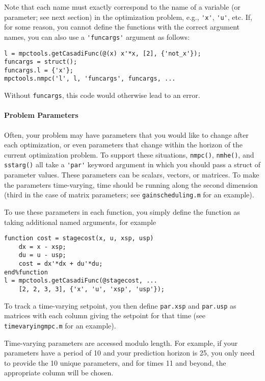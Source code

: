 \documentclass{article}
\begin{document}
\begin{multicols}{2}
Note that each name must exactly correspond to the name of a variable (or parameter; see next section) in the optimization problem, e.g., \lstinline|'x'|, \lstinline|'u'|, etc.
If, for some reason, you cannot define the functions with the correct argument names, you can also use a \lstinline|'funcargs'| argument as follows:
%
\begin{lstlisting}[frame=L]
l = mpctools.getCasadiFunc(@(x) x'*x, [2], {'not_x'});
funcargs = struct();
funcargs.l = {'x'};
mpctools.nmpc('l', l, 'funcargs', funcargs, ...
\end{lstlisting}
%
Without \lstinline|funcargs|, this code would otherwise lead to an error.

\paragraph*{Problem Parameters}

Often, your problem may have parameters that you would like to change after each optimization, or even parameters that change within the horizon of the current optimization problem.
To support these situations, \lstinline|nmpc()|, \lstinline|nmhe()|, and \lstinline|sstarg()| all take a \lstinline|'par'| keyword argument in which you should pass a struct of parameter values.
These parameters can be scalars, vectors, or matrices.
To make the parameters time-varying, time should be running along the second dimension (third in the case of matrix parameters; see \texttt{gainscheduling.m} for an example).

To use these parameters in each function, you simply define the function as taking additional named arguments, for example
%
\begin{lstlisting}[frame=L]
function cost = stagecost(x, u, xsp, usp)
    dx = x - xsp;
    du = u - usp;
    cost = dx'*dx + du'*du;
end%function
l = mpctools.getCasadiFunc(@stagecost, ...
    [2, 2, 3, 3], {'x', 'u', 'xsp', 'usp'});
\end{lstlisting}
%
To track a time-varying setpoint, you then define \lstinline|par.xsp| and \lstinline|par.usp| as matrices with each column giving the setpoint for that time (see \texttt{timevaryingmpc.m} for an example).

Time-varying parameters are accessed modulo length.
For example, if your parameters have a period of 10 and your prediction horizon is 25, you only need to provide the 10 unique parameters, and for times 11 and beyond, the appropriate column will be chosen.

\end{multicols}
\end{document}
